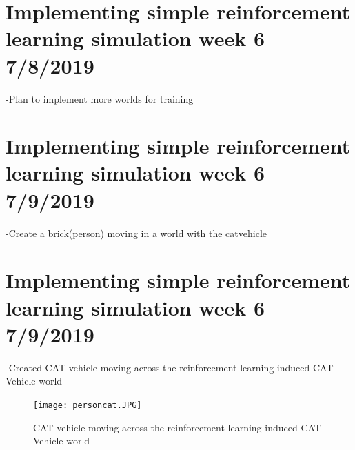 \documentclass[12pt]{article}
\begin{document}
\section{Implementing simple reinforcement learning simulation week 6 7/8/2019}

-Plan to implement more worlds for training

\section{Implementing simple reinforcement learning simulation week 6 7/9/2019}

-Create a brick(person) moving in a world with the catvehicle

\section{Implementing simple reinforcement learning simulation week 6 7/9/2019}

-Created CAT vehicle moving across the reinforcement learning induced CAT Vehicle world

\begin{figure}[h]
\begin{center}
	\texttt{[image: personcat.JPG]}
	\caption{CAT vehicle moving across the reinforcement learning induced CAT Vehicle world}
\end{center}
\end{figure}
\end{document}
